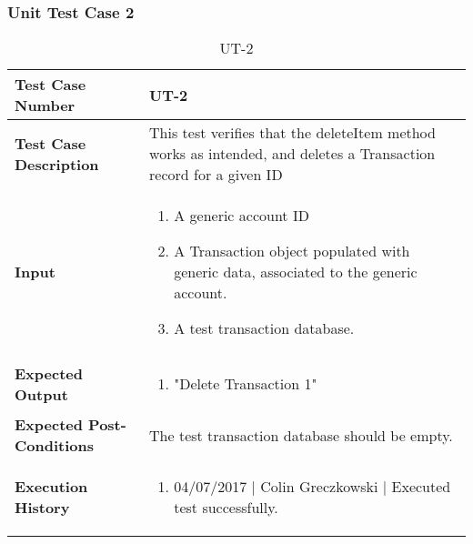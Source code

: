 \documentclass[12pt]{article}
\begin{document}
\subsubsection{Unit Test Case 2} \label{tc:2}
\begin{table}[htbp]
\centering
\caption {UT-2}
\label{UT-2}
\begin{tabularx}{\textwidth}{ | l | X |}
\hline
\textbf{Test Case Number}      &  UT-2                         \\ \hline
\textbf{Test Case Description}    &  This test verifies that the deleteItem method works as intended, and deletes a Transaction record for a given ID                \\ \hline
\textbf{Input}         & 	\begin{enumerate}
          \item A generic account ID
	\item A Transaction object populated with generic data, associated to the generic account.
	\item A test transaction database.
\end{enumerate} \\ \hline

\textbf{Expected Output}     & \begin{enumerate}
	\item "Delete Transaction 1"
\end{enumerate} \\ \hline
\textbf{Expected Post-Conditions}           & The test transaction database should be empty.                \\ \hline
\textbf{Execution History}   &  \begin{enumerate}
	\item 04/07/2017 | Colin Greczkowski | Executed test successfully.
\end {enumerate} \\ \hline
\end{tabularx}
\end{table}
\clearpage
\end{document}
